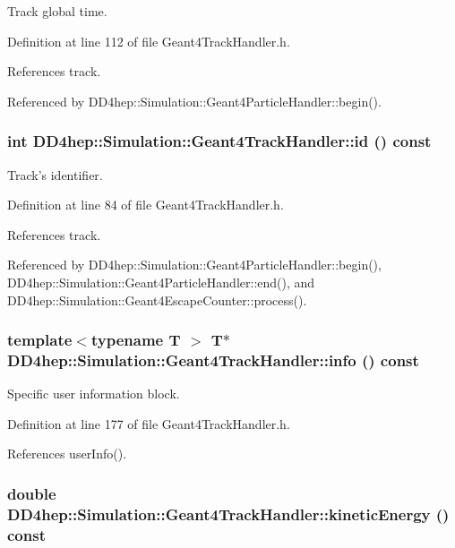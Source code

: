 Track global time. 

Definition at line 112 of file Geant4TrackHandler.h.

References track.

Referenced by DD4hep::Simulation::Geant4ParticleHandler::begin().\hypertarget{class_d_d4hep_1_1_simulation_1_1_geant4_track_handler_a752a1a03018a5876076a6dc0872871ee}{
\subsubsection[{id}]{\setlength{\rightskip}{0pt plus 5cm}int DD4hep::Simulation::Geant4TrackHandler::id () const}}
\label{class_d_d4hep_1_1_simulation_1_1_geant4_track_handler_a752a1a03018a5876076a6dc0872871ee}


Track's identifier. 

Definition at line 84 of file Geant4TrackHandler.h.

References track.

Referenced by DD4hep::Simulation::Geant4ParticleHandler::begin(), DD4hep::Simulation::Geant4ParticleHandler::end(), and DD4hep::Simulation::Geant4EscapeCounter::process().\hypertarget{class_d_d4hep_1_1_simulation_1_1_geant4_track_handler_a32b937f003ac5ca77676fcd2486279e4}{
\subsubsection[{info}]{\setlength{\rightskip}{0pt plus 5cm}template$<$typename T $>$ {\bf T}$\ast$ DD4hep::Simulation::Geant4TrackHandler::info () const}}
\label{class_d_d4hep_1_1_simulation_1_1_geant4_track_handler_a32b937f003ac5ca77676fcd2486279e4}


Specific user information block. 

Definition at line 177 of file Geant4TrackHandler.h.

References userInfo().\hypertarget{class_d_d4hep_1_1_simulation_1_1_geant4_track_handler_a7186b098fbff57fc9a547bff5602c1f5}{
\subsubsection[{kineticEnergy}]{\setlength{\rightskip}{0pt plus 5cm}double DD4hep::Simulation::Geant4TrackHandler::kineticEnergy () const}}
\label{class_d_d4hep_1_1_simulation_1_1_geant4_track_handler_a7186b098fbff57fc9a547bff5602c1f5}


